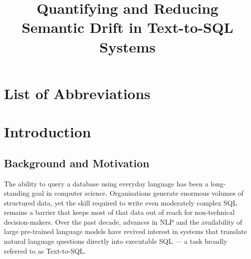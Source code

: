 \documentclass[12pt,a4paper]{report}
\title{Quantifying and Reducing Semantic Drift in Text-to-SQL Systems}
\begin{document}



\tableofcontents
\listoffigures
\listoftables

\chapter*{List of Abbreviations}
\begin{acronym}[NLIDB]
\end{acronym}

\chapter{Introduction}
\label{ch:introduction}

\section{Background and Motivation}
\label{sec:background}

The ability to query a database using everyday language has been a long-standing goal in computer science. Organisations generate enormous volumes of structured data, yet the skill required to write even moderately complex \ac{SQL} remains a barrier that keeps most of that data out of reach for non-technical decision-makers. Over the past decade, advances in \ac{NLP} and the availability of large pre-trained language models have revived interest in systems that translate natural language questions directly into executable \ac{SQL} — a task broadly referred to as Text-to-SQL.
\end{document}

